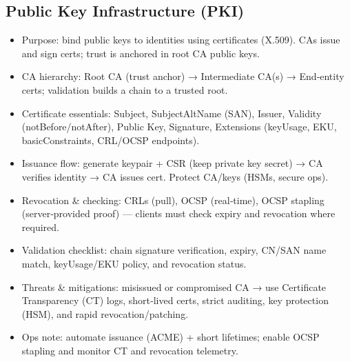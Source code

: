 \documentclass{article}
\begin{document}
\subsection{Public Key Infrastructure (PKI)}
\begin{itemize}
  \item Purpose: bind public keys to identities using certificates (X.509). CAs issue and sign certs; trust is anchored in root CA public keys.
  \item CA hierarchy: Root CA (trust anchor) → Intermediate CA(s) → End‑entity certs; validation builds a chain to a trusted root.
  \item Certificate essentials: Subject, SubjectAltName (SAN), Issuer, Validity (notBefore/notAfter), Public Key, Signature, Extensions (keyUsage, EKU, basicConstraints, CRL/OCSP endpoints).
  \item Issuance flow: generate keypair + CSR (keep private key secret) → CA verifies identity → CA issues cert. Protect CA/keys (HSMs, secure ops).
  \item Revocation \& checking: CRLs (pull), OCSP (real‑time), OCSP stapling (server‑provided proof) — clients must check expiry and revocation where required.
  \item Validation checklist: chain signature verification, expiry, CN/SAN name match, keyUsage/EKU policy, and revocation status.
  \item Threats \& mitigations: misissued or compromised CA → use Certificate Transparency (CT) logs, short‑lived certs, strict auditing, key protection (HSM), and rapid revocation/patching.
  \item Ops note: automate issuance (ACME) + short lifetimes; enable OCSP stapling and monitor CT and revocation telemetry.
\end{itemize}
\end{document}
